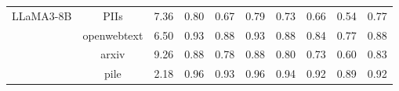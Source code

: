 \begin{table*}[ht]
{\begin{tabular}{ccc ccc ccc c}
\multirow{4}{*}{LLaMA3-8B}    & PIIs                     & 7.36                 & 0.80     & 0.67     & 0.79      & 0.73     & 0.66     & 0.54     & 0.77                 \\
                              & openwebtext              & 6.50                 & 0.93     & 0.88     & 0.93      & 0.88     & 0.84     & 0.77     & 0.88                 \\
                              & arxiv                    & 9.26                 & 0.88     & 0.78     & 0.88      & 0.80     & 0.73     & 0.60     & 0.83                 \\
                              & pile                     & 2.18                 & 0.96     & 0.93     & 0.96      & 0.94     & 0.92     & 0.89     & 0.92                 \\ \bottomrule[1.5pt]
\end{tabular}}
\vspace{-1em}
\end{table*}

